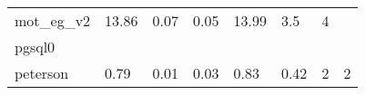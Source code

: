 {\begin{tabular}{l|llll|l|l|l}
mot\_eg\_v2                                & \multicolumn{1}{l|}{13.86}      & \multicolumn{1}{l|}{0.07} & \multicolumn{1}{l|}{0.05}      & 13.99                      & 3.5                                                                                                         & 4                                                                                                  &                                                                                                \\
pgsql0                                     & \multicolumn{1}{l|}{}           & \multicolumn{1}{l|}{}     & \multicolumn{1}{l|}{}          &                            &                                                                                                        &                                                                                                  &                                                                                                \\
peterson                                   & \multicolumn{1}{l|}{0.79}       & \multicolumn{1}{l|}{0.01} & \multicolumn{1}{l|}{0.03}      & 0.83                       & 0.42                                                                                                   & 2                                                                                                & 2                                                                                             
\end{tabular}%
}